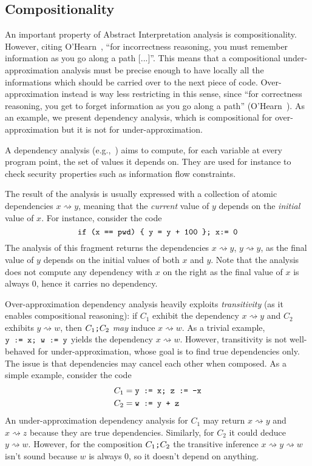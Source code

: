 \subsection*{Compositionality}
An important property of Abstract Interpretation analysis is compositionality. However, citing O'Hearn~\cite[§8]{OHearn20}, ``for incorrectness reasoning, you must remember information as you go along a path [...]''. This means that a compositional under-approximation analysis must be precise enough to have locally all the informations which should be carried over to the next piece of code. Over-approximation instead is way less restricting in this sense, since ``for correctness reasoning, you get to forget information as you go along a path'' (O'Hearn~\cite[§8]{OHearn20}). As an example, we present dependency analysis, which is compositional for over-approximation but it is not for under-approximation.

\begin{example}
	A dependency analysis (e.g.,~\cite[\S 6]{ANSTT17}) aims to compute, for each variable at every program point, the set of values it depends on. They are used for instance to check security properties such as information flow constraints.

	The result of the analysis is usually expressed with a collection of atomic dependencies $x \rightsquigarrow y$, meaning that the \emph{current} value of $y$ depends on the \emph{initial} value of $x$.
	For instance, consider the code
	\[
	\texttt{if (x == pwd) \{ y = y + 100 \}; x:= 0}
	\]
	The analysis of this fragment returns the dependencies $x \rightsquigarrow y$, $y \rightsquigarrow y$, as the final value of $y$ depends on the initial values of both $x$ and $y$. Note that the analysis does not compute any dependency with $x$ on the right as the final value of $x$ is always $0$, hence it carries no dependency.

	Over-approximation dependency analysis heavily exploits \emph{transitivity} (as it enables compositional reasoning): if $C_1$ exhibit the dependency $x \rightsquigarrow y$ and $C_2$ exhibits $y \rightsquigarrow w$, then $C_1 \texttt{;} C_2$ \emph{may} induce $x \rightsquigarrow w$. As a trivial example, $\texttt{y := x; w := y}$ yields the dependency $x \rightsquigarrow w$.
	However, transitivity is not well-behaved for under-approximation, whose goal is to find true dependencies only. The issue is that dependencies may cancel each other when composed. As a simple example, consider the code
	\begin{align*}
		C_1 & = \texttt{y := x; z := -x} \\
		C_2 & = \texttt{w := y + z}
	\end{align*}
	An under-approximation dependency analysis for $C_1$ may return $x \rightsquigarrow y$ and $x \rightsquigarrow z$ because they are true dependencies. Similarly, for $C_2$ it could deduce $y \rightsquigarrow w$. However, for the composition $C_1 \texttt{;} C_2$ the transitive inference $x \rightsquigarrow y \rightsquigarrow w$ isn't sound because $w$ is always $0$, so it doesn't depend on anything.
\end{example}

